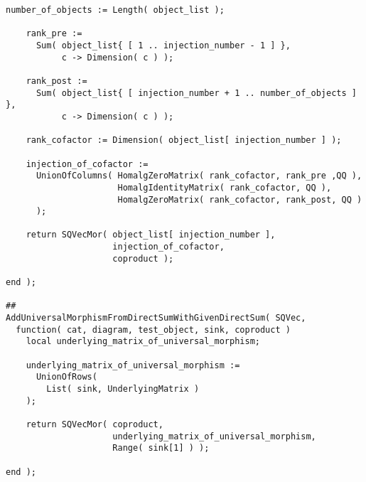 \begin{small}
\begin{Verbatim}[frame=single]
    number_of_objects := Length( object_list );
    
    rank_pre :=
      Sum( object_list{ [ 1 .. injection_number - 1 ] },
           c -> Dimension( c ) );
    
    rank_post :=
      Sum( object_list{ [ injection_number + 1 .. number_of_objects ] },
           c -> Dimension( c ) );
    
    rank_cofactor := Dimension( object_list[ injection_number ] );
    
    injection_of_cofactor := 
      UnionOfColumns( HomalgZeroMatrix( rank_cofactor, rank_pre ,QQ ),
                      HomalgIdentityMatrix( rank_cofactor, QQ ),
                      HomalgZeroMatrix( rank_cofactor, rank_post, QQ )
      );
    
    return SQVecMor( object_list[ injection_number ],
                     injection_of_cofactor,
                     coproduct );
    
end );

##
AddUniversalMorphismFromDirectSumWithGivenDirectSum( SQVec,
  function( cat, diagram, test_object, sink, coproduct )
    local underlying_matrix_of_universal_morphism;
    
    underlying_matrix_of_universal_morphism :=
      UnionOfRows(
        List( sink, UnderlyingMatrix )
    );
    
    return SQVecMor( coproduct,
                     underlying_matrix_of_universal_morphism,
                     Range( sink[1] ) );
    
end );
\end{Verbatim}
\end{small}
